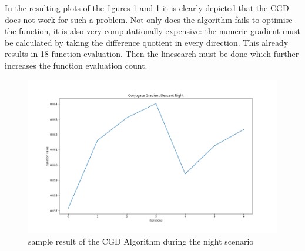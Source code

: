 \documentclass[./\jobname.tex]{subfiles}
\begin{document}
\begin{table}[H]
	\centering
	\noindent{}
	\label{tab:exp_cgd_day}
\end{table}

In the resulting plots of the figures \ref{fig:exp_cgd_night_result} and \ref{fig:exp_cgd_night_result} it is clearly depicted that the CGD does not work for such a problem. Not only does the algorithm fails to optimise the function, it is also very computationally expensive: the numeric gradient must be calculated by taking the difference quotient in every direction. This already results in 18 function evaluation. Then the linesearch must be done which further increases the function evaluation count. 

\begin{figure}[H]
	\centering
	\includegraphics[width=\textwidth]{../img/png/cgd_night.png}
	\caption{sample result of the CGD Algorithm during the night scenario}
	\label{fig:exp_cgd_night_result}
\end{figure}
\end{document}
